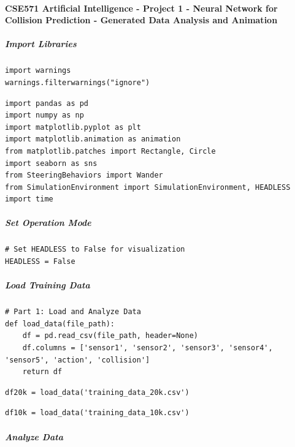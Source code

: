 \paragraph{CSE571 Artificial Intelligence - Project 1 - Neural Network for Collision Prediction - Generated Data Analysis and Animation}

\subparagraph{Import Libraries}

\begin{verbatim}
import warnings
warnings.filterwarnings("ignore")
\end{verbatim}

\begin{verbatim}
import pandas as pd
import numpy as np
import matplotlib.pyplot as plt
import matplotlib.animation as animation
from matplotlib.patches import Rectangle, Circle
import seaborn as sns
from SteeringBehaviors import Wander
from SimulationEnvironment import SimulationEnvironment, HEADLESS
import time
\end{verbatim}

\subparagraph{Set Operation Mode}

\begin{verbatim}
# Set HEADLESS to False for visualization
HEADLESS = False
\end{verbatim}

\subparagraph{Load Training Data}

\begin{verbatim}
# Part 1: Load and Analyze Data
def load_data(file_path):
    df = pd.read_csv(file_path, header=None)
    df.columns = ['sensor1', 'sensor2', 'sensor3', 'sensor4', 'sensor5', 'action', 'collision']
    return df
\end{verbatim}

\begin{verbatim}
df20k = load_data('training_data_20k.csv')
\end{verbatim}

\begin{verbatim}
df10k = load_data('training_data_10k.csv')
\end{verbatim}

\subparagraph{Analyze Data}

